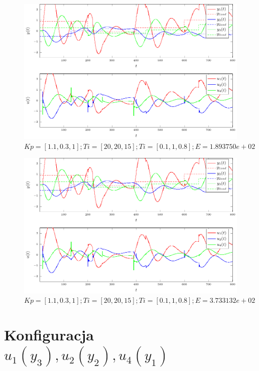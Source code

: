 \documentclass[a4paper,titlepage,11pt,twosides,floatssmall]{mwrep}
\begin{document}
\begin{figure}[H]
	\centering
	\includegraphics[scale=1]{../wykresy/zad4_pid_5_2.pdf}
	\caption{$Kp = [1.1, 0.3, 1]; Ti = [20, 20, 15]; Ti = [0.1, 1, 0.8]; E = 1.893750e+02$}
\end{figure}

\begin{figure}[H]
	\centering
	\includegraphics[scale=1]{../wykresy/zad4_pid_5_3.pdf}
	\caption{$Kp = [1.1, 0.3, 1]; Ti = [20, 20, 15]; Ti = [0.1, 1, 0.8]; E = 3.733132e+02$}
\end{figure}


\section*{Konfiguracja $u_1(y_3), u_2(y_2), u_4(y_1)$}

\end{document}

